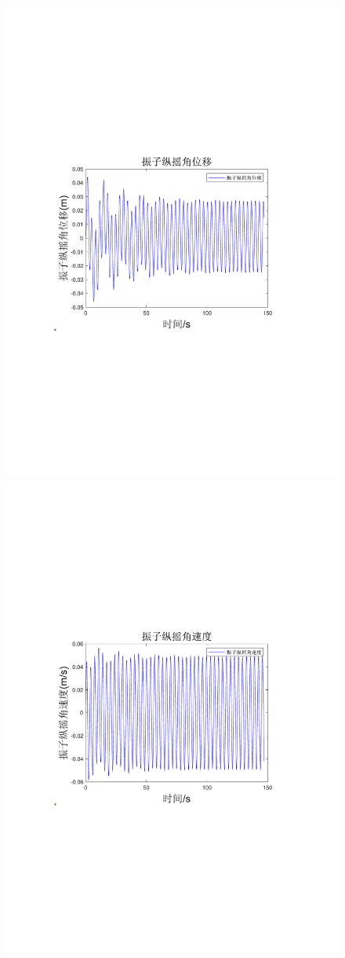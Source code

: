 \documentclass[12pt,utf8]{article}
\begin{document}
\begin{figure}[htbp]
\begin{minipage}{0.45\linewidth}
		\includegraphics[width=0.9\linewidth]{figures/振子纵摇角位移.pdf}
	\end{minipage}
	\begin{minipage}{0.45\linewidth}
		\includegraphics[width=0.9\linewidth]{figures/振子纵摇角速度.pdf}

\end{minipage}
\end{figure}
\end{document}
